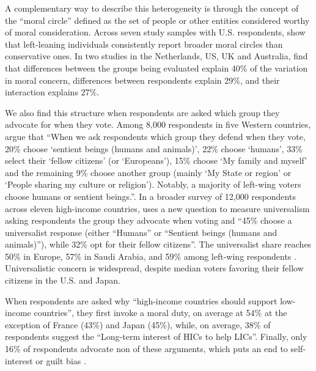 \documentclass[11pt,a4paper]{article}
\begin{document}

A complementary way to describe this heterogeneity is through the concept of the ``moral circle'' defined as the set of people or other entities considered worthy of moral consideration. Across seven study samples with U.S. respondents, \citet{waytz_ideological_2019} show that left-leaning individuals consistently report broader moral circles than conservative ones. %
In two studies in the Netherlands, US, UK and Australia, \citet{jaeger_relative_2023} find that differences between the groups being evaluated explain 40\% of the variation in moral concern, differences between respondents explain 29\%, and their interaction explains 27\%. %

We also find this structure when respondents are asked which group they advocate for when they vote. Among 8,000 respondents in five Western countries, \citet{fabre_majority_2025} argue that ``When we ask respondents which group they defend when they vote, 20\% choose ‘sentient beings (humans and animals)’, 22\% choose ‘humans’, 33\% select their ‘fellow citizens’ (or ‘Europeans’), 15\% choose ‘My family and myself’ and the remaining 9\% choose another group (mainly ‘My State or region’ or ‘People sharing my culture or religion’). Notably, a majority of left-wing voters choose humans or sentient beings.''. In a broader survey of 12,000 respondents across eleven 
high-income 
countries, \citet{fabre_public_2026} uses a new question to measure universalism asking respondents the group they advocate when voting and ``45\% choose a universalist  response (either “Humans” or “Sentient beings (humans and animals)”), while 32\% opt for their fellow citizens''. The universalist share reaches 50\% in Europe, 57\% in Saudi Arabia, and 59\% among left-wing respondents \citep{fabre_public_2026}. Universalistic concern is widespread, despite median voters favoring their fellow citizens in the U.S. and Japan.



When respondents are asked why ``high-income countries should support low-income countries'', they first invoke a moral duty, on average at 54\% at the exception of France (43\%) and Japan (45\%), while, on average, 38\% of respondents suggest the ``Long-term interest of HICs to help LICs''. Finally, only 16\% of respondents advocate non of these arguments, which puts an end to self-interest or guilt bias \citep{fabre_public_2026}.


\newpage


\end{document}
